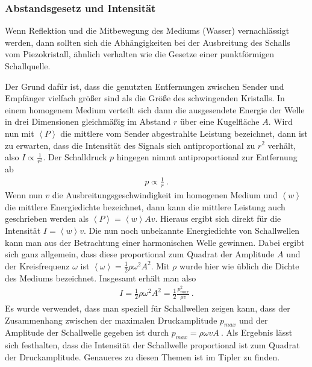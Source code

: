 \documentclass[12pt,a4paper,titlepage,headinclude,bibtotoc]{scrartcl}
\numberwithin{equation}{subsection}
\begin{document}
\subsubsection{Abstandsgesetz und Intensität}
\label{sec:abs}
Wenn Reflektion und die Mitbewegung des Mediums (Wasser) vernachlässigt werden, dann sollten sich die Abhängigkeiten bei der Ausbreitung des Schalls vom Piezokristall, ähnlich verhalten wie die Gesetze einer punktförmigen Schallquelle.

Der Grund dafür ist, dass die genutzten Entfernungen zwischen Sender und Empfänger vielfach größer sind als die Größe des schwingenden Kristalls. 
In einem homogenem Medium verteilt sich dann die ausgesendete Energie der Welle in drei Dimensionen gleichmäßig im Abstand $r$ über eine Kugelfläche $A$.
Wird nun mit $\left<P\right>$ die mittlere vom Sender abgestrahlte Leistung 
bezeichnet, dann ist zu erwarten, dass die Intensität des Signals sich antiproportional zu $r^2$ verhält, also $I \propto \frac{1}{r^2}$.
Der Schalldruck $p$ hingegen nimmt antiproportional zur Entfernung ab
\begin{align}
 p \propto \frac{1}{r}~.
\end{align}
Wenn nun $v$ die Ausbreitungsgeschwindigkeit im homogenen Medium und $\left<w\right>$ die mittlere Energiedichte bezeichnet, dann kann die mittlere Leistung auch geschrieben werden als $\left<P\right>  = \left<w\right> A v$.
Hieraus ergibt sich direkt für die Intensität $I = \left<w\right> v$.
Die nun noch unbekannte Energiedichte von Schallwellen kann man aus der Betrachtung einer harmonischen Welle gewinnen. Dabei ergibt sich ganz allgemein, dass diese 
proportional zum Quadrat der Amplitude $A$ und der Kreisfrequenz $\omega$ ist $\left<\omega\right> = \frac{1}{2} \rho \omega^2 A^2$.
Mit $\rho$ wurde hier wie üblich die Dichte des Mediums bezeichnet.
Insgesamt erhält man also
\begin{align}
 I = \frac{1}{2} \rho \omega^2 A^2 = \frac{1}{2} \frac{p_{max}^2}{\rho v}~.
\end{align}
Es wurde verwendet, dass man speziell für Schallwellen zeigen kann, dass der Zusammenhang zwischen der maximalen Druckamplitude $p_{max}$ und der Amplitude der Schallwelle gegeben ist durch $p_{max} = \rho \omega v A~. $
Als Ergebnis lässt sich festhalten, dass die Intensität der Schallwelle proportional ist zum Quadrat der Druckamplitude. Genaueres zu diesen Themen ist im Tipler \cite[S.598]{tipler} zu finden.
\end{document}
